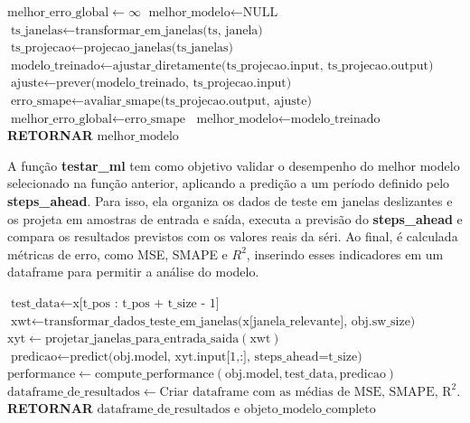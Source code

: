 \documentclass[12pt]{tcc}
\begin{document}
\begin{algorithm}
\caption{treinar\_ml}
\label{alg:train_ml}
\begin{algorithmic}[1]
    \State $\text{melhor\_erro\_global} \gets \infty$
    \State $\text{melhor\_modelo} \gets \text{NULL}$
        \State $\text{ts\_janelas} \gets \text{transformar\_em\_janelas(ts, janela)}$
        \State $\text{ts\_projecao} \gets \text{projecao\_janelas(ts\_janelas)}$
            \State $\text{modelo\_treinado} \gets \text{ajustar\_diretamente(ts\_projecao.input, ts\_projecao.output)}$
            \State $\text{ajuste} \gets \text{prever(modelo\_treinado, ts\_projecao.input)}$
            \State $\text{erro\_smape} \gets \text{avaliar\_smape(ts\_projecao.output, ajuste)}$
                \State $\text{melhor\_erro\_global} \gets \text{erro\_smape}$
                \State $\text{melhor\_modelo} \gets \text{modelo\_treinado}$
            \EndIf
        \EndFor
    \EndFor
    \State \textbf{RETORNAR} $\text{melhor\_modelo}$
\EndFunction
\end{algorithmic}
\end{algorithm}

A função \textbf{testar\_ml} tem como objetivo validar o desempenho do melhor modelo selecionado na função anterior, aplicando a predição a um período definido pelo \textbf{steps\_ahead}. Para isso, ela organiza os dados de teste em janelas deslizantes e os projeta em amostras de entrada e saída, executa a previsão do \textbf{steps\_ahead} e compara os resultados previstos com os valores reais da séri. Ao final, é calculada métricas de erro, como MSE, SMAPE e $R^2$, inserindo esses indicadores em um dataframe para permitir a análise do modelo.

\begin{algorithm}
\caption{testar\_ml}
\label{alg:test_ml}
\begin{algorithmic}[1]
    \State $\text{test\_data} \gets \text{x[t\_pos : t\_pos + t\_size - 1]}$
    \State $\text{xwt} \gets \text{transformar\_dados\_teste\_em\_janelas(x[janela\_relevante], obj.sw\_size)}$
    \State $\text{xyt} \gets \text{projetar\_janelas\_para\_entrada\_saida}(\text{xwt})$
    \State $\text{predicao} \gets \text{predict(obj.model, xyt.input[1,:], steps\_ahead=t\_size)}$
    \State $\text{performance} \gets \text{compute\_performance}(\text{obj.model}, \text{test\_data}, \text{predicao})$
    \State $\text{dataframe\_de\_resultados} \gets \text{Criar dataframe com as médias de MSE, SMAPE, R}^2\text{.}$
    \State \textbf{RETORNAR} $\text{dataframe\_de\_resultados}$ e $\text{objeto\_modelo\_completo}$
\EndFunction
\end{algorithmic}
\end{algorithm}
\end{document}
